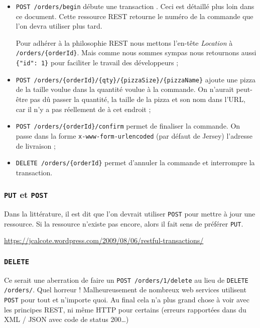 \begin{itemize}
    \item \verb|POST /orders/begin| débute une transaction . Ceci est détaillé
                                    plus loin dans ce document. Cette ressource REST retourne le numéro
                                    de la commande que l'on devra utiliser plus tard.

                                    Pour adhérer à la philosophie REST nous mettons l'en-tête \emph{Location}
                                    à  \verb|/orders/{orderId}|. Mais comme nous sommes sympas nous retournons
                                    aussi \verb|{"id": 1}| pour faciliter le travail des développeurs ;

    \item \verb|POST /orders/{orderId}/{qty}/{pizzaSize}/{pizzaName}| ajoute une pizza de la taille voulue
            dans la quantité voulue à la commande. On n'aurait peut-être pas dû passer la quantité, la taille de
            la pizza et son nom dans l'URL, car il n'y a pas réellement de  à cet endroit ;

    \item \verb|POST /orders/{orderId}/confirm| permet de finaliser la commande. On passe dans la forme
            \verb|x-www-form-urlencoded| (par défaut de Jersey) l'adresse de livraison ;

    \item \verb|DELETE /orders/{orderId}| permet d'annuler la commande et interrompre la transaction.
\end{itemize}

\cprotect\subsubsection{\verb|PUT| et \verb|POST|}

Dans la littérature, il est dit que l'on devrait utiliser \verb|POST|  pour mettre à jour une ressource.
Si la ressource n'existe pas encore, alors il fait sens de préférer \verb|PUT|.

\url{https://jcalcote.wordpress.com/2009/08/06/restful-transactions/}

\cprotect\subsubsection{\verb|DELETE|}

Ce serait une aberration de faire un \verb|POST /orders/1/delete| au lieu de \verb|DELETE /orders/|.
Quel horreur ! Malheureusement de nombreux
web services utilisent \verb|POST| pour tout et n'importe quoi. Au final cela n'a plus grand chose à voir
avec les principes REST, ni même HTTP pour certains  (erreurs rapportées
dans du XML / JSON avec code de status 200\dots)

